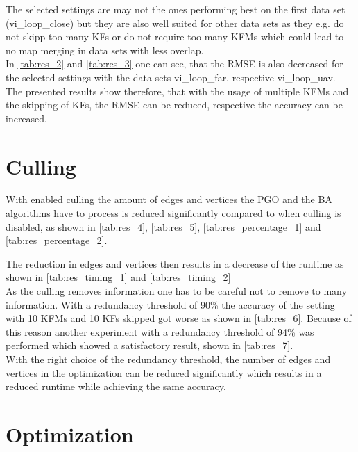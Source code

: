 The selected settings are may not the ones performing best on the first data set (vi\_loop\_close) but they are also well suited for other data sets as they e.g. do not skipp too many \acp{KF} or do not require too many \acp{KFM} which could lead to no map merging in data sets with less overlap.\\

In \autoref{tab:res_2} and \autoref{tab:res_3} one can see, that the \ac{RMSE} is also decreased for the selected settings with the data sets vi\_loop\_far, respective vi\_loop\_uav.\\

The presented results show therefore, that with the usage of multiple \acp{KFM} and the skipping of \acp{KF}, the \ac{RMSE} can be reduced, respective the accuracy can be increased.

\section{Culling}

With enabled culling the amount of edges and vertices the \ac{PGO} and the \ac{BA} algorithms have to process is reduced significantly compared to when culling is disabled, as shown in \autoref{tab:res_4}, \autoref{tab:res_5}, \autoref{tab:res_percentage_1} and \autoref{tab:res_percentage_2}.

The reduction in edges and vertices then results in a decrease of the runtime as shown in \autoref{tab:res_timing_1} and \autoref{tab:res_timing_2}\\

As the culling removes information one has to be careful not to remove to many information. With a redundancy threshold of 90\% the accuracy of the setting with 10 \acp{KFM} and 10 \acp{KF} skipped got worse as shown in \autoref{tab:res_6}. Because of this reason another experiment with a redundancy threshold of 94\% was performed which showed a satisfactory result, shown in \autoref{tab:res_7}.\\

With the right choice of the redundancy threshold, the number of edges and vertices in the optimization can be reduced significantly which results in a reduced runtime while achieving the same accuracy. 

\section{Optimization}

